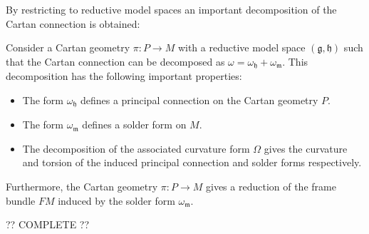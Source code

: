     By restricting to reductive model spaces an important decomposition of the Cartan connection is obtained:
    \begin{property}
        Consider a Cartan geometry $\pi:P\rightarrow M$ with a reductive model space $(\mathfrak{g},\mathfrak{h})$ such that the Cartan connection can be decomposed as $\omega=\omega_{\mathfrak{h}}+\omega_{\mathfrak{m}}$. This decomposition has the following important properties:
        \begin{itemize}
            \item The form $\omega_\mathfrak{h}$ defines a principal connection on the Cartan geometry $P$.
            \item The form $\omega_\mathfrak{m}$ defines a solder form on $M$.
            \item The decomposition of the associated curvature form $\Omega$ gives the curvature and torsion of the induced principal connection and solder forms respectively.
        \end{itemize}
        Furthermore, the Cartan geometry $\pi:P\rightarrow M$ gives a reduction of the frame bundle $FM$ induced by the solder form $\omega_\mathfrak{m}$.
    \end{property}
    ?? COMPLETE ??